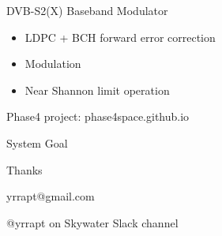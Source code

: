 \documentclass[10pt]{beamer}
\begin{document}
\begin{frame}{DVB-S2(X) Baseband Modulator}

\begin{figure}[h]
\end{figure}

\begin{itemize}
 \item LDPC + BCH forward error correction
 \item Modulation
 \item Near Shannon limit operation
\end{itemize}

\small Phase4 project: phase4space.github.io

\end{frame}

\begin{frame}{System Goal}

\begin{figure}[h]
\end{figure}

\end{frame}


\begin{frame}{Thanks}

yrrapt@gmail.com

@yrrapt on Skywater Slack channel

\end{frame}
\end{document}
